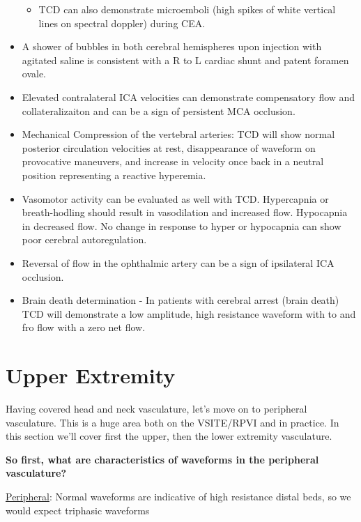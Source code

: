 \documentclass[
]{book}
\providecommand{\tightlist}{%
  \setlength{\itemsep}{0pt}\setlength{\parskip}{0pt}}
\begin{document}
\begin{itemize}
  \begin{itemize}
  \tightlist
  \item
    TCD can also demonstrate microemboli (high spikes of white
    vertical lines on spectral doppler) during CEA.
  \end{itemize}
\item
  A shower of bubbles in both cerebral hemispheres upon injection with
  agitated saline is consistent with a R to L cardiac shunt and patent
  foramen ovale.\citep{zito2009}
\item
  Elevated contralateral ICA velocities can demonstrate compensatory
  flow and collateralizaiton and can be a sign of persistent MCA
  occlusion.
\item
  Mechanical Compression of the vertebral arteries: TCD will show
  normal posterior circulation velocities at rest, disappearance of
  waveform on provocative maneuvers, and increase in velocity once
  back in a neutral position representing a reactive
  hyperemia.\citep{vilela2005}
\item
  Vasomotor activity can be evaluated as well with TCD. Hypercapnia or
  breath-hodling should result in vasodilation and increased flow.
  Hypocapnia in decreased flow. No change in response to hyper or
  hypocapnia can show poor cerebral autoregulation.\citep{müller1995}
\item
  Reversal of flow in the ophthalmic artery can be a sign of
  ipsilateral ICA occlusion.\citep{guan2013}
\item
  Brain death determination - In patients with cerebral arrest (brain
  death) TCD will demonstrate a low amplitude, high resistance
  waveform with to and fro flow with a zero net flow.
\end{itemize}

\hypertarget{upper-extremity}{%
\section{Upper Extremity}\label{upper-extremity}}

Having covered head and neck vasculature, let's move on to peripheral
vasculature. This is a huge area both on the VSITE/RPVI and in practice.
In this section we'll cover first the upper, then the lower extremity
vasculature.

\textbf{So first, what are characteristics of waveforms in the peripheral
vasculature?}

\uline{Peripheral}: Normal waveforms are indicative of high
resistance distal beds, so we would expect triphasic waveforms
\end{document}
